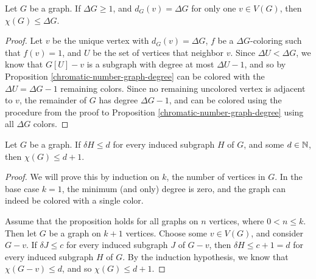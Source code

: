 \begin{prop}\label{single-maximum-degree}
    Let $G$ be a graph. If $\Delta G \geq 1$, and $d_G(v) = \Delta G$ for only one $v \in V(G)$, then $\chi(G) \leq \Delta G$.
\end{prop}

\begin{proof}
    Let $v$ be the unique vertex with $d_G(v) = \Delta G$, $f$ be a $\Delta G$-coloring such that $f(v) = 1$, and $U$ be the set of vertices that neighbor $v$. Since $\Delta U < \Delta G$, we know that $G[U] - v$ is a subgraph with degree at most $\Delta U - 1$, and so by Proposition \ref{chromatic-number-graph-degree} can be colored with the $\Delta U = \Delta G - 1$ remaining colors. Since no remaining uncolored vertex is adjacent to $v$, the remainder of $G$ has degree $\Delta G - 1$, and can be colored using the procedure from the proof to Proposition \ref{chromatic-number-graph-degree} using all $\Delta G$ colors.
\end{proof}

\begin{prop}\label{induced-subgraphs-minimum-degree}
    Let $G$ be a graph. If $\delta H \leq d$ for every induced subgraph $H$ of $G$, and some $d \in \mathbb{N}$, then $\chi(G) \leq d+1$.
\end{prop}

\begin{proof}
    We will prove this by induction on $k$, the number of vertices in $G$. In the base case $k=1$, the minimum (and only) degree is zero, and the graph can indeed be colored with a single color.

    Assume that the proposition holds for all graphs on $n$ vertices, where $0 < n \leq k$. Then let $G$ be a graph on $k+1$ vertices. Choose some $v \in V(G)$, and consider $G - v$. If $\delta J \leq c$ for every induced subgraph $J$ of $G - v$, then $\delta H \leq c +1 = d$ for every induced subgraph $H$ of $G$. By the induction hypothesis, we know that $\chi(G - v) \leq d$, and so $\chi(G) \leq d+1$.
\end{proof}

